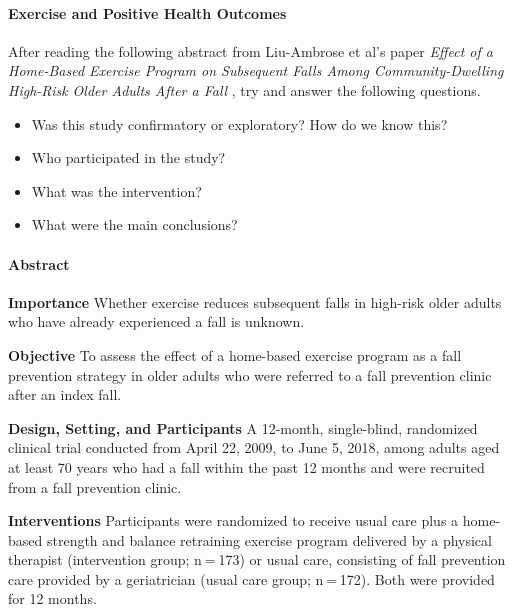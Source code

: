 \documentclass[
]{book}
\providecommand{\tightlist}{%
  \setlength{\itemsep}{0pt}\setlength{\parskip}{0pt}}
\begin{document}
\hypertarget{exercise-and-positive-health-outcomes}{%
\paragraph*{Exercise and Positive Health Outcomes}\label{exercise-and-positive-health-outcomes}}

After reading the following abstract from Liu-Ambrose et al's paper \emph{Effect of a Home-Based Exercise Program on Subsequent Falls Among Community-Dwelling High-Risk Older Adults After a Fall} \citep{liu-ambrose_effect_2019}, try and answer the following questions.

\begin{itemize}
\tightlist
\item
  Was this study confirmatory or exploratory? How do we know this?
\item
  Who participated in the study?
\item
  What was the intervention?
\item
  What were the main conclusions?
\end{itemize}

\hypertarget{abstract}{%
\paragraph*{Abstract}\label{abstract}}

\textbf{Importance} Whether exercise reduces subsequent falls in high-risk older adults who have already experienced a fall is unknown.

\textbf{Objective} To assess the effect of a home-based exercise program as a fall prevention strategy in older adults who were referred to a fall prevention clinic after an index fall.

\textbf{Design, Setting, and Participants} A 12-month, single-blind, randomized clinical trial conducted from April 22, 2009, to June 5, 2018, among adults aged at least 70 years who had a fall within the past 12 months and were recruited from a fall prevention clinic.

\textbf{Interventions} Participants were randomized to receive usual care plus a home-based strength and balance retraining exercise program delivered by a physical therapist (intervention group; n = 173) or usual care, consisting of fall prevention care provided by a geriatrician (usual care group; n = 172). Both were provided for 12 months.
\end{document}
